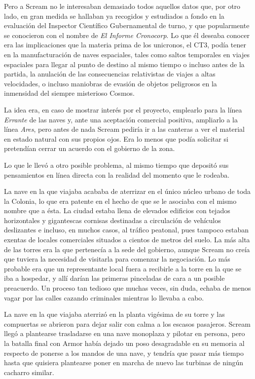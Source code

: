 Pero a Scream no le interesaban demasiado todos aquellos datos que, por otro lado, en gran medida se hallaban ya recogidos y estudiados a fondo en la evaluación del Inspector Científico Gubernamental de turno, y que popularmente se conocieron con el nombre de \emph{El Informe Cronocorp}. Lo que él deseaba conocer era las implicaciones que la materia prima de los unicronos, el CT3, podía tener en la manufacturación de naves espaciales, tales como saltos temporales en viajes espaciales para llegar al punto de destino al mismo tiempo o incluso antes de la partida, la anulación de las consecuencias relativistas de viajes a altas velocidades, o incluso maniobras de evasión de objetos peligrosos en la inmensidad del siempre misterioso Cosmos.

La idea era, en caso de mostrar interés por el proyecto, emplearlo para la línea \emph{Errante} de las naves y, ante una aceptación comercial positiva, ampliarlo a la línea \emph{Ares}, pero antes de nada Scream pediría ir a las canteras a ver el material en estado natural con sus propios ojos. Era lo menos que podía solicitar si pretendían cerrar un acuerdo con el gobierno de la zona.

Lo que le llevó a otro posible problema, al mismo tiempo que depositó sus pensamientos en línea directa con la realidad del momento que le rodeaba.

La nave en la que viajaba acababa de aterrizar en el único núcleo urbano de toda la Colonia, lo que era patente en el hecho de que se le asociaba con el mismo nombre que a ésta. La ciudad estaba llena de elevados edificios con tejados horizontales y gigantescas cornisas destinadas a circulación de vehículos deslizantes e incluso, en muchos casos, al tráfico peatonal, pues tampoco estaban exentas de locales comerciales situados a cientos de metros del suelo. La más alta de las torres era la que pertenecía a la sede del gobierno, aunque Scream no creía que tuviera la necesidad de visitarla para comenzar la negociación. Lo más probable era que un representante local fuera a recibirle a la torre en la que se iba a hospedar, y allí darían las primeras pinceladas de cara a un posible preacuerdo. Un proceso tan tedioso que muchas veces, sin duda, echaba de menos vagar por las calles cazando criminales mientras lo llevaba a cabo.

La nave en la que viajaba aterrizó en la planta vigésima de su torre y las compuertas se abrieron para dejar salir con calma a los escasos pasajeros. Scream llegó a plantearse trasladarse en una nave monoplaza y pilotar en persona, pero la batalla final con Armor había dejado un poso desagradable en su memoria al respecto de ponerse a los mandos de una nave, y tendría que pasar más tiempo hasta que quisiera plantearse poner en marcha de nuevo las turbinas de ningún cacharro similar.

